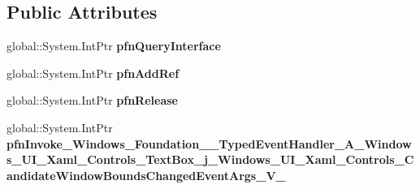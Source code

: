 \subsection*{Public Attributes}
\begin{DoxyCompactItemize}
\item 
\mbox{\label{struct_windows_1_1_foundation_1_1_typed_event_handler___a___windows___u_i___xaml___controls___tea8675657ada60f534086508fa4403c3f_a5cf1ecb19d7d5d99f7f819e9f816b25a}} 
global\+::\+System.\+Int\+Ptr {\bfseries pfn\+Query\+Interface}
\item 
\mbox{\label{struct_windows_1_1_foundation_1_1_typed_event_handler___a___windows___u_i___xaml___controls___tea8675657ada60f534086508fa4403c3f_a2ecebca6875ff742d2c41b75027a627b}} 
global\+::\+System.\+Int\+Ptr {\bfseries pfn\+Add\+Ref}
\item 
\mbox{\label{struct_windows_1_1_foundation_1_1_typed_event_handler___a___windows___u_i___xaml___controls___tea8675657ada60f534086508fa4403c3f_a644b56357d095b3d18b3820a3d07fb84}} 
global\+::\+System.\+Int\+Ptr {\bfseries pfn\+Release}
\item 
\mbox{\label{struct_windows_1_1_foundation_1_1_typed_event_handler___a___windows___u_i___xaml___controls___tea8675657ada60f534086508fa4403c3f_a50bd6c4816175c47e9c103ceb6bd9194}} 
global\+::\+System.\+Int\+Ptr {\bfseries pfn\+Invoke\+\_\+\+Windows\+\_\+\+Foundation\+\_\+\+\_\+\+Typed\+Event\+Handler\+\_\+\+A\+\_\+\+Windows\+\_\+\+U\+I\+\_\+\+Xaml\+\_\+\+Controls\+\_\+\+Text\+Box\+\_\+j\+\_\+\+Windows\+\_\+\+U\+I\+\_\+\+Xaml\+\_\+\+Controls\+\_\+\+Candidate\+Window\+Bounds\+Changed\+Event\+Args\+\_\+\+V\+\_\+}
\end{DoxyCompactItemize}
